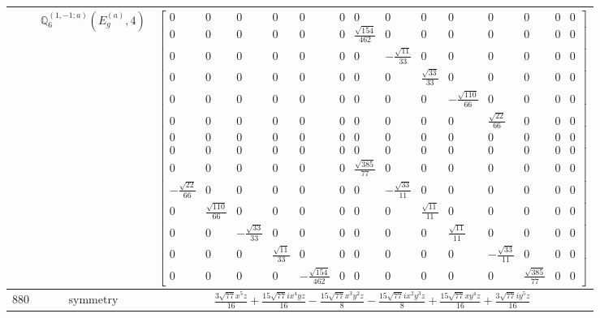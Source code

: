 \documentclass[fleqn,8pt,landscape]{jsarticle}
\begin{document}
\begin{longtable}{ccc}
$  $ & $ \mathbb{Q}_{6}^{(1,-1;a)}(E_{g}^{(a)},4) $ & $ \begin{bmatrix} 0 & 0 & 0 & 0 & 0 & 0 & 0 & 0 & 0 & 0 & 0 & 0 & 0 & 0 \\ 0 & 0 & 0 & 0 & 0 & 0 & \frac{\sqrt{154}}{462} & 0 & 0 & 0 & 0 & 0 & 0 & 0 \\ 0 & 0 & 0 & 0 & 0 & 0 & 0 & - \frac{\sqrt{11}}{33} & 0 & 0 & 0 & 0 & 0 & 0 \\ 0 & 0 & 0 & 0 & 0 & 0 & 0 & 0 & \frac{\sqrt{33}}{33} & 0 & 0 & 0 & 0 & 0 \\ 0 & 0 & 0 & 0 & 0 & 0 & 0 & 0 & 0 & - \frac{\sqrt{110}}{66} & 0 & 0 & 0 & 0 \\ 0 & 0 & 0 & 0 & 0 & 0 & 0 & 0 & 0 & 0 & \frac{\sqrt{22}}{66} & 0 & 0 & 0 \\ 0 & 0 & 0 & 0 & 0 & 0 & 0 & 0 & 0 & 0 & 0 & 0 & 0 & 0 \\ 0 & 0 & 0 & 0 & 0 & 0 & 0 & 0 & 0 & 0 & 0 & 0 & 0 & 0 \\ 0 & 0 & 0 & 0 & 0 & 0 & \frac{\sqrt{385}}{77} & 0 & 0 & 0 & 0 & 0 & 0 & 0 \\ - \frac{\sqrt{22}}{66} & 0 & 0 & 0 & 0 & 0 & 0 & - \frac{\sqrt{33}}{11} & 0 & 0 & 0 & 0 & 0 & 0 \\ 0 & \frac{\sqrt{110}}{66} & 0 & 0 & 0 & 0 & 0 & 0 & \frac{\sqrt{11}}{11} & 0 & 0 & 0 & 0 & 0 \\ 0 & 0 & - \frac{\sqrt{33}}{33} & 0 & 0 & 0 & 0 & 0 & 0 & \frac{\sqrt{11}}{11} & 0 & 0 & 0 & 0 \\ 0 & 0 & 0 & \frac{\sqrt{11}}{33} & 0 & 0 & 0 & 0 & 0 & 0 & - \frac{\sqrt{33}}{11} & 0 & 0 & 0 \\ 0 & 0 & 0 & 0 & - \frac{\sqrt{154}}{462} & 0 & 0 & 0 & 0 & 0 & 0 & \frac{\sqrt{385}}{77} & 0 & 0 \end{bmatrix} $ \\ \hline
$ 880 $ & $ \text{symmetry} $ & $ \frac{3 \sqrt{77} x^{5} z}{16} + \frac{15 \sqrt{77} i x^{4} y z}{16} - \frac{15 \sqrt{77} x^{3} y^{2} z}{8} - \frac{15 \sqrt{77} i x^{2} y^{3} z}{8} + \frac{15 \sqrt{77} x y^{4} z}{16} + \frac{3 \sqrt{77} i y^{5} z}{16} $ \\

\end{longtable}
\end{document}
